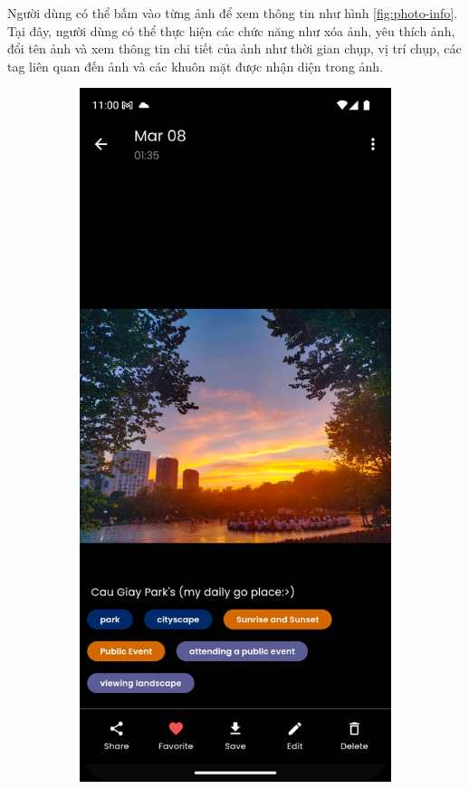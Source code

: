 Người dùng có thể bấm vào từng ảnh để xem thông tin như hình \ref{fig:photo-info}. Tại đây, người dùng có thể thực hiện các chức năng như xóa ảnh, yêu thích ảnh, đổi tên ảnh và xem thông tin chi tiết của ảnh như thời gian chụp, vị trí chụp, các tag liên quan đến ảnh và các khuôn mặt được nhận diện trong ảnh.

\begin{figure}[H]
    \centering
    \begin{subfigure}{0.48\textwidth}
        \includegraphics[width=1\linewidth]{figures/c4/4-2/image.png} 

\end{subfigure}
\end{figure}
